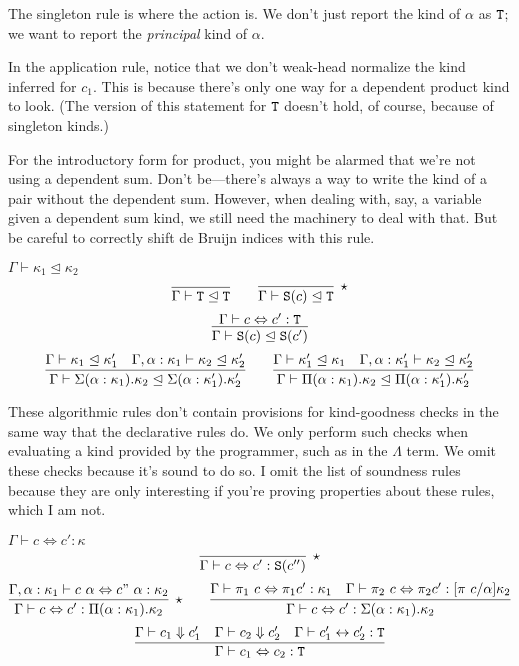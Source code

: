 The singleton rule is where the action is. We don't just report the kind of $\alpha$ as
$\textnormal{\texttt{T}}$; we want to report the \emph{principal} kind of $\alpha$.

In the application rule, notice that we don't weak-head normalize the kind inferred for
$c_1$. This is because there's only one way for a dependent product kind to look. (The version
of this statement for $\textnormal{\texttt{T}}$ doesn't hold, of course, because of singleton kinds.)

For the introductory form for product, you might be alarmed that we're not using a dependent sum.
Don't be---there's always a way to write the kind of a pair without the dependent sum. However,
when dealing with, say, a variable given a dependent sum kind, we still need the machinery to
deal with that. But be careful to correctly shift de Bruijn indices with this rule.

\begin{judgment}[Subkinding]
  $\Gamma \vdash \kappa_1 \trianglelefteq \kappa_2$
  \[
    \infer{\Gamma \vdash \T \trianglelefteq \T}{}
    \qquad
    \infer[\star]{\Gamma \vdash \S(c) \trianglelefteq \T}{}
  \]
  \[
    \infer{\Gamma \vdash \S(c) \trianglelefteq \S(c')}{\Gamma \vdash c \Leftrightarrow c' : \T}
  \]
  \[
    \infer{\Gamma \vdash \Sigma(\alpha : \kappa_1). \kappa_2 \trianglelefteq
      \Sigma(\alpha : \kappa_1').\kappa_2'}
      {\Gamma \vdash \kappa_1 \trianglelefteq \kappa_1'
      &\Gamma, \alpha : \kappa_1 \vdash \kappa_2 \trianglelefteq \kappa_2'
      }
    \qquad
    \infer{\Gamma \vdash \Pi(\alpha : \kappa_1). \kappa_2 \trianglelefteq \Pi(\alpha: \kappa_1'). \kappa_2'}
    {\Gamma \vdash \kappa_1' \trianglelefteq \kappa_1
    &\Gamma, \alpha : \kappa_1' \vdash \kappa_2 \trianglelefteq \kappa_2'
    }
  \]
\end{judgment}

These algorithmic rules don't contain provisions for kind-goodness checks in the same way
that the declarative rules do. We only perform such checks when evaluating a kind provided by
the programmer, such as in the $\Lambda$ term. We omit these checks because it's sound to do so.
I omit the list of soundness rules because they are only interesting if you're proving properties
about these rules, which I am not.


\begin{judgment} $\Gamma \vdash c \Leftrightarrow c' : \kappa$
  \[
    \infer[\star]{\Gamma \vdash c \Leftrightarrow c' : \S(c'')}{}
  \]
  \[
    \infer[\star]
      {\Gamma \vdash c \Leftrightarrow c' : \Pi(\alpha : \kappa_1). \kappa_2}
      {\Gamma, \alpha : \kappa_1 \vdash c~\alpha \Leftrightarrow c"~\alpha : \kappa_2}
    \qquad
    \infer
      {\Gamma \vdash c \Leftrightarrow c' : \Sigma(\alpha : \kappa_1). \kappa_2}
      {\Gamma \vdash \pi_1~c \Leftrightarrow \pi_1 c' : \kappa_1
      &\Gamma \vdash \pi_2~c \Leftrightarrow \pi_2c' : [\pi~c/\alpha]\kappa_2
      }
  \]
  \[
    \infer{\Gamma \vdash c_1 \Leftrightarrow c_2 : \T}
      {\Gamma \vdash c_1 \Downarrow c_1'
      &\Gamma\vdash c_2 \Downarrow c_2'
      &\Gamma \vdash c_1' \leftrightarrow c_2' : \T
      }
  \]
\end{judgment}

